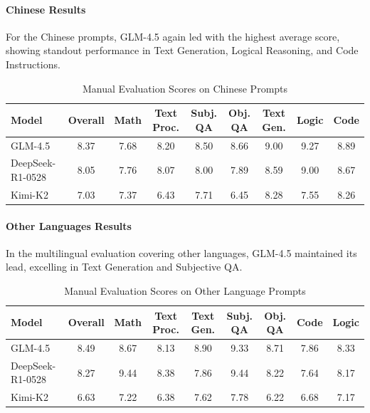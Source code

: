 \documentclass{article}
\theoremstyle{definition}
\begin{document}
\paragraph{Chinese Results}
For the Chinese prompts, GLM-4.5 again led with the highest average score, showing standout performance in Text Generation, Logical Reasoning, and Code Instructions.
\begin{table}[h!]
\centering
\caption{Manual Evaluation Scores on Chinese Prompts}
\label{tab:chn-results}
\footnotesize
\begin{tabular}{@{}l@{}cccccccc@{}}
\toprule
\textbf{Model} & \textbf{Overall} & \textbf{Math} & \textbf{Text Proc.} & \textbf{Subj. QA} & \textbf{Obj. QA} & \textbf{Text Gen.} & \textbf{Logic} & \textbf{Code} \\
\midrule
GLM-4.5 & 8.37 & 7.68 & 8.20 & 8.50 & 8.66 & 9.00 & 9.27 & 8.89 \\
DeepSeek-R1-0528 & 8.05 & 7.76 & 8.07 & 8.00 & 7.89 & 8.59 & 9.00 & 8.67 \\
Kimi-K2 & 7.03 & 7.37 & 6.43 & 7.71 & 6.45 & 8.28 & 7.55 & 8.26 \\
\bottomrule
\end{tabular}
\end{table}

\paragraph{Other Languages Results}
In the multilingual evaluation covering other languages, GLM-4.5 maintained its lead, excelling in Text Generation and Subjective QA.
\begin{table}[h!]
\centering
\caption{Manual Evaluation Scores on Other Language Prompts}
\label{tab:other-lang-results}
\footnotesize
\begin{tabular}{@{}l@{}cccccccc@{}}
\toprule
\textbf{Model} & \textbf{Overall} & \textbf{Math} & \textbf{Text Proc.} & \textbf{Text Gen.} & \textbf{Subj. QA} & \textbf{Obj. QA} & \textbf{Code} & \textbf{Logic} \\
\midrule
GLM-4.5 & 8.49 & 8.67 & 8.13 & 8.90 & 9.33 & 8.71 & 7.86 & 8.33 \\
DeepSeek-R1-0528 & 8.27 & 9.44 & 8.38 & 7.86 & 9.44 & 8.22 & 7.64 & 8.17 \\
Kimi-K2 & 6.63 & 7.22 & 6.38 & 7.62 & 7.78 & 6.22 & 6.68 & 7.17 \\
\bottomrule
\end{tabular}
\end{table}
\end{document}
